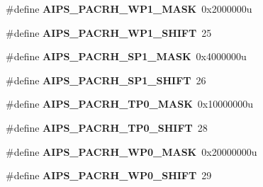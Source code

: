 \begin{DoxyCompactItemize}
\item 
\hypertarget{group___a_i_p_s___register___masks_gad57bca9c6a0696ff5ff69fb0095e1d40}{}\#define {\bfseries A\+I\+P\+S\+\_\+\+P\+A\+C\+R\+H\+\_\+\+W\+P1\+\_\+\+M\+A\+S\+K}~0x2000000u\label{group___a_i_p_s___register___masks_gad57bca9c6a0696ff5ff69fb0095e1d40}

\item 
\hypertarget{group___a_i_p_s___register___masks_ga2b431a34d1df62b2702605212d674116}{}\#define {\bfseries A\+I\+P\+S\+\_\+\+P\+A\+C\+R\+H\+\_\+\+W\+P1\+\_\+\+S\+H\+I\+F\+T}~25\label{group___a_i_p_s___register___masks_ga2b431a34d1df62b2702605212d674116}

\item 
\hypertarget{group___a_i_p_s___register___masks_ga8589686bfd42b91c287dade9448bccea}{}\#define {\bfseries A\+I\+P\+S\+\_\+\+P\+A\+C\+R\+H\+\_\+\+S\+P1\+\_\+\+M\+A\+S\+K}~0x4000000u\label{group___a_i_p_s___register___masks_ga8589686bfd42b91c287dade9448bccea}

\item 
\hypertarget{group___a_i_p_s___register___masks_gad2ed240b86e914d9651d23c7a82ba6dc}{}\#define {\bfseries A\+I\+P\+S\+\_\+\+P\+A\+C\+R\+H\+\_\+\+S\+P1\+\_\+\+S\+H\+I\+F\+T}~26\label{group___a_i_p_s___register___masks_gad2ed240b86e914d9651d23c7a82ba6dc}

\item 
\hypertarget{group___a_i_p_s___register___masks_ga19347470438077f9a7bb86277fb35b25}{}\#define {\bfseries A\+I\+P\+S\+\_\+\+P\+A\+C\+R\+H\+\_\+\+T\+P0\+\_\+\+M\+A\+S\+K}~0x10000000u\label{group___a_i_p_s___register___masks_ga19347470438077f9a7bb86277fb35b25}

\item 
\hypertarget{group___a_i_p_s___register___masks_ga7dca4b86d51d4bb3a756d466936c57b3}{}\#define {\bfseries A\+I\+P\+S\+\_\+\+P\+A\+C\+R\+H\+\_\+\+T\+P0\+\_\+\+S\+H\+I\+F\+T}~28\label{group___a_i_p_s___register___masks_ga7dca4b86d51d4bb3a756d466936c57b3}

\item 
\hypertarget{group___a_i_p_s___register___masks_ga553a81f66ab6f4a89c8ed5edb75d6caf}{}\#define {\bfseries A\+I\+P\+S\+\_\+\+P\+A\+C\+R\+H\+\_\+\+W\+P0\+\_\+\+M\+A\+S\+K}~0x20000000u\label{group___a_i_p_s___register___masks_ga553a81f66ab6f4a89c8ed5edb75d6caf}

\item 
\hypertarget{group___a_i_p_s___register___masks_ga2e196f27c387540cefb7f247c65bd6b4}{}\#define {\bfseries A\+I\+P\+S\+\_\+\+P\+A\+C\+R\+H\+\_\+\+W\+P0\+\_\+\+S\+H\+I\+F\+T}~29\label{group___a_i_p_s___register___masks_ga2e196f27c387540cefb7f247c65bd6b4}


\end{DoxyCompactItemize}
